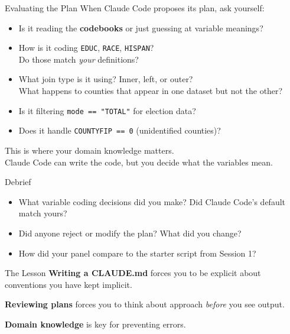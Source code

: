 \documentclass[aspectratio=169, 11pt]{beamer}
\begin{document}
\begin{frame}{Evaluating the Plan}
  When Claude Code proposes its plan, ask yourself:

  \vspace{0.5em}
  \begin{itemize}
    \item Is it reading the \textbf{codebooks} or just guessing at variable meanings?
    \item How is it coding \texttt{EDUC}, \texttt{RACE}, \texttt{HISPAN}?\\
      {\small Do those match \textit{your} definitions?}
    \item What join type is it using? Inner, left, or outer?\\
      {\small What happens to counties that appear in one dataset but not the other?}
    \item Is it filtering \texttt{mode == "TOTAL"} for election data?
    \item Does it handle \texttt{COUNTYFIP == 0} (unidentified counties)?
  \end{itemize}

  \vspace{0.5em}
  \alert{This is where your domain knowledge matters.}\\
  Claude Code can write the code, but you decide what the variables mean.
\end{frame}

\begin{frame}{Debrief}
  \begin{itemize}
    \item What variable coding decisions did you make? Did Claude Code's default match yours?
    \item Did anyone reject or modify the plan? What did you change?
    \item How did your panel compare to the starter script from Session 1?
  \end{itemize}

  \vspace{0.8em}
  \begin{block}{The Lesson}
    \textbf{Writing a CLAUDE.md} forces you to be explicit about conventions you have kept implicit.

    \vspace{0.3em}
    \textbf{Reviewing plans} forces you to think about approach \textit{before} you see output.

    \vspace{0.3em}
    \textbf{Domain knowledge} is key for preventing errors.
  \end{block}
\end{frame}
\end{document}
